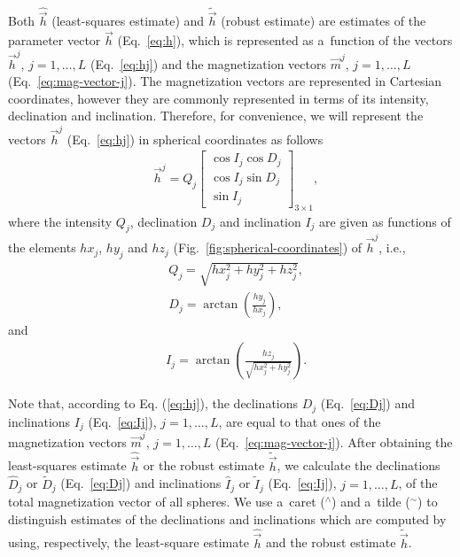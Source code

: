 \documentclass[journal abbreviation, npg]{copernicus}
\begin{document}
Both $\hat{\vec{h}}$ (least-squares estimate) and $\tilde{\vec{h}}$ (robust
estimate) are estimates of the parameter vector $\vec{h}$ (Eq.~\ref{eq:h}),
which is represented as a~function of the vectors $\vec{h}^{j}$, $j = 1,
\ldots, L$ (Eq.~\ref{eq:hj}) and the magnetization vectors $\vec{m}^{j}$, $j
= 1, \ldots, L$ (Eq.~\ref{eq:mag-vector-j}). The magnetization vectors are
represented in Cartesian coordinates, however they are commonly represented
in terms of its intensity, declination and inclination. Therefore, for
convenience, we will represent the vectors $\vec{h}^{j}$ (Eq.~\ref{eq:hj}) in
spherical coordinates as follows
\begin{align}
 &
\vec{h}^{j} = Q_{j}
\begin{bmatrix}
\cos I_{j}  \cos D_{j} \\
\cos I_{j}  \sin D_{j} \\
\sin I_{j}
\end{bmatrix}
_{3 \times 1} ,
\label{eq:hj-spheric}
\end{align}
where the intensity $Q_{j}$, declination $D_{j}$ and inclination
$I_{j}$ are given as functions of the elements $hx_{j}$, $hy_{j}$ and
$hz_{j}$ (Fig.~\ref{fig:spherical-coordinates}) of $\vec{h}^{j}$,
i.e.,
\begin{align}
 &
Q_{j} = \sqrt{hx_{j}^{2} + hy_{j}^{2} + hz_{j}^{2}},
\label{eq:Qj}
\\
&
D_{j} = \arctan \left(\frac{hy_{j}}{hx_{j}} \right),
\label{eq:Dj}
\end{align}
and
\begin{align}
 &
I_{j} = \arctan \left(\frac{hz_{j}}{\sqrt{hx_{j}^{2} + hy_{j}^{2}}} \right).
\label{eq:Ij}
\end{align}

Note that, according to Eq. (\ref{eq:hj}), the declinations $D_{j}$
(Eq.~\ref{eq:Dj}) and inclinations $I_{j}$ (Eq.~\ref{eq:Ij}), $j = 1, \ldots,
L$, are equal to that ones of the magnetization vectors $\vec{m}^{j}$, $j =
1, \ldots, L$ (Eq.~\ref{eq:mag-vector-j}). After obtaining the least-squares
estimate $\hat{\vec{h}}$ or the robust estimate $\tilde{\vec{h}}$, we
calculate the declinations $\hat{D}_{j}$ or $\tilde{D}_{j}$ (Eq.~\ref{eq:Dj})
and inclinations $\hat{I}_{j}$ or $\tilde{I}_{j}$ (Eq.~\ref{eq:Ij}), $j = 1,
\ldots, L$, of the total magnetization vector of all spheres. We use a~caret
($^\wedge$) and a~tilde ($^\sim$) to distinguish estimates of the
declinations and inclinations which are computed by using, respectively, the
least-square estimate $\hat{\vec{h}}$ and the robust estimate
$\tilde{\vec{h}}$.
\end{document}
